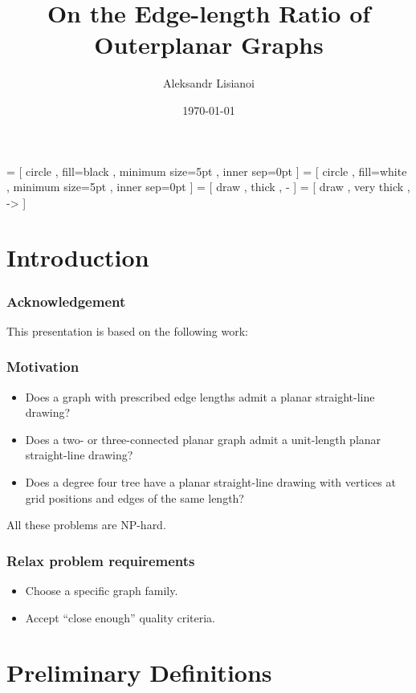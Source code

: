 \documentclass[xetex,mathserif,serif]{beamer}
\title{On the Edge-length Ratio of Outerplanar Graphs}
\author{Aleksandr Lisianoi}
\institute{Technische Universität Wien}
\date{\today}
\begin{document}
 = [
  circle
  , fill=black
  , minimum size=5pt
  , inner sep=0pt
]
 = [
  circle
  , fill=white
  , minimum size=5pt
  , inner sep=0pt
]
 = [
  draw
  , thick
  , -
]
 = [
  draw
  , very thick
  , ->
]


\maketitle

\section{Introduction}

\begin{frame}
  \frametitle{Acknowledgement}

  This presentation is based on the following work:

\end{frame}

\begin{frame}
  \frametitle{Motivation}

  \begin{itemize}
  \item Does a graph with prescribed edge lengths admit a planar straight-line drawing?
    \pause
  \item Does a two- or three-connected planar graph admit a unit-length planar straight-line drawing?
    \pause
  \item Does a degree four tree have a planar straight-line drawing with vertices at grid positions and edges of the same length?
  \end{itemize}
  \pause
  \begin{center}
    All these problems are NP-hard.
  \end{center}

\end{frame}

\begin{frame}
  \frametitle{Relax problem requirements}
  \begin{itemize}
  \item Choose a specific graph family.
  \item Accept ``close enough'' quality criteria.
    \end{itemize}
\end{frame}

\section{Preliminary Definitions}
\end{document}
